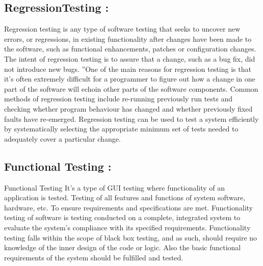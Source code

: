 \documentclass[oneside,a4paper,12pt]{report}
\begin{document}
{\subsection{RegressionTesting : }
Regression testing is any type of software testing that seeks to uncover new errors, or regressions, in existing functionality after changes have been made to the software, such as functional enhancements, patches or configuration changes. The intent of regression testing is to assure that a change, such as a bug fix, did not introduce new bugs. ”One of the main reasons for regression testing is that it’s often extremely difficult for a programmer to figure out how a change in one part of the software will echoin other parts of the software components. Common methods of regression testing include re-running previously run tests and checking whether program behaviour has changed and whether previously fixed faults have re-emerged. Regression testing can be used to test a system efficiently by systematically selecting the appropriate minimum set of tests needed to adequately cover a particular change.

\subsection{Functional Testing : }
Functional Testing It’s a type of GUI testing where functionality of an application is tested. Testing of all features and functions of system software, hardware, etc. To ensure requirements and specifications are met. Functionality testing of software is testing conducted on a complete, integrated system to evaluate the system’s compliance with its specified requirements. Functionality testing falls within the scope of black box testing, and as such, should require no knowledge of the inner design of the code or logic. Also the basic functional requirements of the system should be fulfilled and tested.

}
\end{document}
